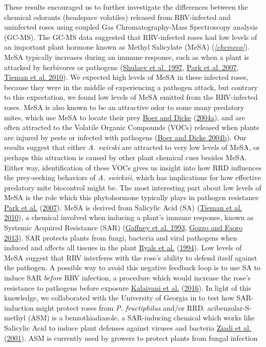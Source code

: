 \documentclass[12pt,final,CPage]{ufthesis}
\begin{document}
{  These results encouraged us to further investigate the differences between the chemical odorants (headspace volatiles) released from RRV-infected and uninfected roses using coupled Gas Chromatography-Mass Spectroscopy analysis (GC-MS). The GC-MS data suggested that RRV-infected roses had low levels of an important plant hormone known as Methyl Salicylate (MeSA) (\emph{\ref{chemeco}}). MeSA typically increases during an immune response, such as when a plant is attacked by herbivores or pathogens (\protect\hyperlink{ref-Shulaev1997}{Shulaev et al. 1997}, \protect\hyperlink{ref-Park2007}{Park et al. 2007}, \protect\hyperlink{ref-Tieman2010}{Tieman et al. 2010}). We expected high levels of MeSA in these infected roses, because they were in the middle of experiencing a pathogen attack, but contrary to this expectation, we found low levels of MeSA emitted from the RRV-infected roses. MeSA is also known to be an attractive odor to some many predatory mites, which use MeSA to locate their prey \protect\hyperlink{ref-Boer2004a}{Boer and Dicke} (\protect\hyperlink{ref-Boer2004a}{2004a}), and are often attracted to the Volatile Organic Compounds (VOCs) released when plants are injured by pests or infected with pathogens (\protect\hyperlink{ref-Boer2004b}{Boer and Dicke 2004b}). Our results suggest that either \emph{A. swirski} are attracted to very low levels of MeSA, or perhaps this attraction is caused by other plant chemical cues besides MeSA. Either way, identification of these VOCs gives us insight into how RRD influences the prey-seeking behaviors of \emph{A. swirksii}, which has implications for how effective predatory mite biocontrol might be. The most interesting part about low levels of MeSA is the role which this phytohormone typically plays in pathogen resistance \protect\hyperlink{ref-Park2007}{Park et al.} (\protect\hyperlink{ref-Park2007}{2007}). MeSA is derived from Salicylic Acid (SA) (\protect\hyperlink{ref-Tieman2010}{Tieman et al. 2010}), a chemical involved when inducing a plant's immune response, known as Systemic Acquired Resistance (SAR) (\protect\hyperlink{ref-Gaffney1993}{Gaffney et al. 1993}, \protect\hyperlink{ref-Gozzo2013}{Gozzo and Faoro 2013}). SAR protects plants from fungi, bacteria and viral pathogens when induced and affects all tissues in the plant \protect\hyperlink{ref-Ryals1994}{Ryals et al.} (\protect\hyperlink{ref-Ryals1994}{1994}). Low levels of MeSA suggest that RRV interferes with the rose's ability to defend itself against the pathogen. A possible way to avoid this negative feedback loop is to use SA to induce SAR \emph{before} RRV infection, a procedure which would increase the rose's resistance to pathogens before exposure \protect\hyperlink{ref-Kalaivani2016}{Kalaivani et al.} (\protect\hyperlink{ref-Kalaivani2016}{2016}). In light of this knowledge, we collaborated with the University of Georgia in to test how SAR-induction might protect roses from \emph{P. fructiphilus} and/or RRD. acibenzolar-S-methyl (ASM) is a benzothiadiazole, a SAR-inducing chemical which works like Salicylic Acid to induce plant defenses against viruses and bacteria \protect\hyperlink{ref-Ziadi2001}{Ziadi et al.} (\protect\hyperlink{ref-Ziadi2001}{2001}). ASM is currently used by growers to protect plants from fungal infection }
\end{document}
